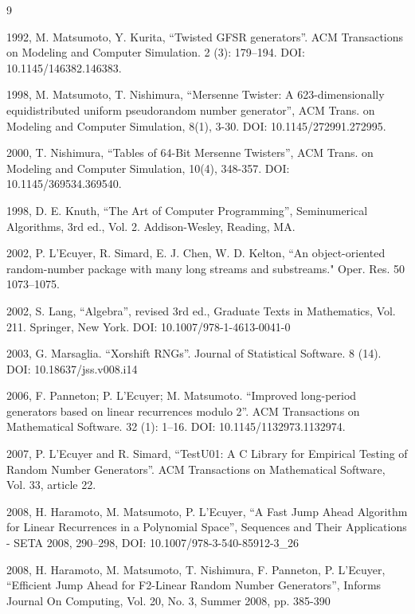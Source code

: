 \documentclass[preprint,1p,times]{elsarticle}
\begin{document}
\begin{thebibliography}{9}

 1992, M. Matsumoto, Y. Kurita, ``Twisted GFSR generators''. ACM Transactions on Modeling and Computer Simulation. 2 (3): 179--194. DOI: 10.1145/146382.146383.

 1998, M. Matsumoto, T. Nishimura, ``Mersenne Twister: A 623-dimensionally equidistributed uniform pseudorandom number generator'', ACM Trans. on Modeling and Computer Simulation, 8(1), 3-30. DOI: 10.1145/272991.272995.

 2000, T. Nishimura, ``Tables of 64-Bit Mersenne Twisters'', ACM Trans. on Modeling and Computer Simulation, 10(4), 348-357. DOI: 10.1145/369534.369540.

 1998, D. E. Knuth, ``The Art of Computer Programming'', Seminumerical Algorithms, 3rd ed., Vol. 2. Addison-Wesley, Reading, MA.

 2002, P. L'Ecuyer, R. Simard, E. J. Chen, W. D. Kelton, ``An object-oriented random-number package with many long streams and substreams." Oper. Res. 50 1073--1075.

 2002, S. Lang, ``Algebra'', revised 3rd ed., Graduate Texts in Mathematics, Vol. 211. Springer, New York. DOI: 10.1007/978-1-4613-0041-0

 2003, G. Marsaglia. ``Xorshift RNGs''. Journal of Statistical Software. 8 (14). DOI: 10.18637/jss.v008.i14

 2006, F. Panneton; P. L'Ecuyer; M. Matsumoto. ``Improved long-period generators based on linear recurrences modulo 2''. ACM Transactions on Mathematical Software. 32 (1): 1--16. DOI: 10.1145/1132973.1132974.

 2007, P. L'Ecuyer and R. Simard, ``TestU01: A C Library for Empirical Testing of Random Number Generators''. ACM Transactions on Mathematical Software, Vol. 33, article 22.

 2008, H. Haramoto, M. Matsumoto, P. L'Ecuyer, ``A Fast Jump Ahead Algorithm for Linear Recurrences in a Polynomial Space'', Sequences and Their Applications - SETA 2008, 290--298, DOI: 10.1007/978-3-540-85912-3\_26

 2008, H. Haramoto, M. Matsumoto, T. Nishimura, F. Panneton, P. L'Ecuyer, ``Efficient Jump Ahead for F2-Linear Random Number Generators'', Informs Journal On Computing, Vol. 20, No. 3, Summer 2008, pp. 385-390


\end{thebibliography}
\end{document}
